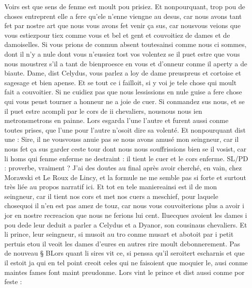 \documentclass{article}
\begin{document}
\begin{pages}
   Voirs est que sens de fenme est moult pou prisiez. Et nonpourquant, trop pou de choses entreprent 
      elle a fere qu’ele n’enne viengne au desus, car nous avons tant fet par nostre 
      art que nous vous avons fet venir ça sus, car 
      nousvous veions 
      que vous estiezpour tiex comme vous et bel et gent et couvoitiez de 
      dames et de damoiselles. Si vous prions de conmun absent toutesainsi comme nous ci 
         sommes, dont il n'y a nule dont vous n'eussiez tost vos volentez se il puet estre 
      que vous nous moustrez s’il a tant de bienproesce 
         en vous et d’onneur conme il 
         aperty a de biaute. \pend
\pstart Dame, dist Celydus, 
   vous parlez a loy de dame preuspreus et cortoise et 
   sagesage et bien apense. Et se tout ce i failloit, si y voi je tele chose 
   qui moult fait a couvoitier. Si ne cuidiez pas que nous lessissions en nule guise a fere chose qui vous peust tourner a honneur ne a 
   joie de cuer. Si conmandez sus nous, et se il puet estre acompli par le cors de 
   ii chevaliers, nousnous nous 
   ien metronsmetrons en 
   painne.
   Lors esgarda l’une l’autre et furent aussi conme toutes prises, que l’une pour l’autre n’osoit dire sa volenté. Et nonpourquant dist une :
   Sire, il ne vousvouss 
      anuie pas se nous avons amusé mon seingneur, 
   car il nous fet ça sus garder ceste tour dont nous nous souffrissions bien se il vosist, car li homs qui fenme 
      enferme ne destraint : il tient le cuer et le cors enferme.
      SL/PD : proverbe, vraiment ? J'ai des doutes au final après avoir cherché, en vain, 
         chez Morawski et Le Roux de Lincy, et la formule ne me semble pas si forte et surtout très liée au propos narratif ici.
      Et tot en tele maniereainsi est il de 
      mon seingneur, car il tient nos cors et met nos cuers a meschief, pour 
      laquele chosequoi il n’en est pas amez de touz, car nous vous 
      couvoiterions plus a avoir i jor en nostre recreacion que 
      nous ne ferions lui cent.
   Iluecques avoient les dames i pou dede leur deduit a parler 
   a Celydus et a Dyanor, 
      son cousinaus chevaliers. Et li prince, 
         leur seingneur, si musoit 
   au tro conme musart et abotoit 
   par i petit pertuis etou il veoit les dames d’eures en autres 
   rire moult debonnerement. \pend 
\pstart Pas de nouveau § BLors 
   quant li sires vit ce, si penssa 
   qu’il seroitert escharnis et que il estoit ja 
      qui en tel point creoit celes qui ne faisoient que moquier le, 
      ausi conme maintes fames font maint preudonme. 
   Lors vint le prince et dist aussi conme por feste :

\end{pages}
\end{document}
